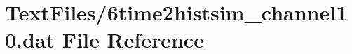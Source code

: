 \hypertarget{6time2histsim__channel10_8dat}{}\section{Text\+Files/6time2histsim\+\_\+channel10.dat File Reference}
\label{6time2histsim__channel10_8dat}
